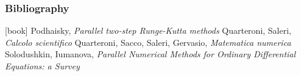 \documentclass{beamer}
\begin{document}
\begin{frame} %
	\frametitle{Bibliography}
	\begin{thebibliography}{9}
		 Podhaisky, \textit{Parallel two-step Runge-Kutta methods}
		 Quarteroni, Saleri, \textit{Calcolo scientifico}
		 Quarteroni, Sacco, Saleri, Gervasio, \textit{Matematica numerica}
		 Solodushkin, Iumanova, \textit{Parallel Numerical Methods for Ordinary Differential Equations: a Survey}	
	\end{thebibliography}
\end{frame}
\end{document}
